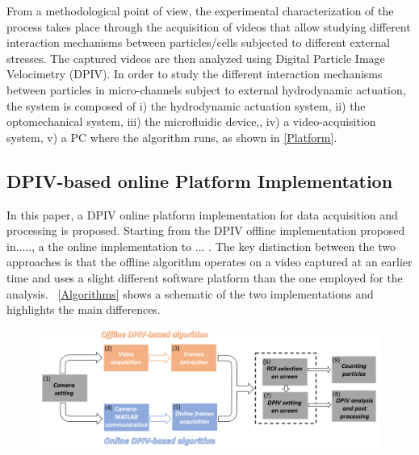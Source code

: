 \documentclass[journal]{IEEEtran}
\theoremstyle{definition}
\theoremstyle{remark}
\begin{document}
From a methodological point of view, the experimental characterization of the process takes place through the acquisition of videos that allow studying different interaction mechanisms between particles/cells subjected to different external stresses.
The captured videos are then analyzed using Digital Particle Image Velocimetry (DPIV).
In order to study the different interaction mechanisms between particles in micro-channels subject to external hydrodynamic actuation, the system is composed of i) the hydrodynamic actuation system, ii) the optomechanical system, iii) the microfluidic device,, iv) a video-acquisition system, v)  a PC where the algorithm runs, as shown in \fig\ref{Platform}.


\subsection{DPIV-based online Platform Implementation}\label{sec:method}

In this paper, a DPIV online platform implementation for data acquisition and processing is proposed. Starting from the DPIV  offline implementation proposed in....., a the online implementation to ... . The key distinction between the two approaches is that the offline algorithm operates on a video captured at an earlier time and uses a slight different software platform than the one employed for the analysis.
~\fig\ref{Algorithms} shows a schematic of the two implementations and highlights the main differences.



\begin{figure}[t]
	\centering
	\includegraphics[width=2\columnwidth]{images/Algorithms}
\end{figure}
\end{document}
